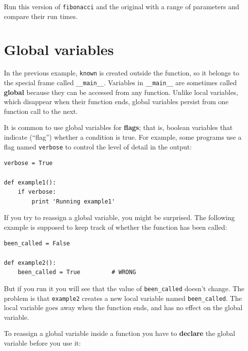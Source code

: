 \documentclass[10pt]{book}
\begin{document}
\begin{ex}
Run this version of {\tt fibonacci} and the original with
a range of parameters and compare their run times.
\end{ex}


\section{Global variables}


In the previous example, {\tt known} is created outside the function,
so it belongs to the special frame called \verb"__main__".
Variables in \verb"__main__" are sometimes called {\bf global}
because they can be accessed from any function.  Unlike local
variables, which disappear when their function ends, global variables
persist from one function call to the next.


It is common to use global variables for {\bf flags}; that is, 
boolean variables that indicate (``flag'') whether a condition
is true.  For example, some programs use
a flag named {\tt verbose} to control the level of detail in the
output:

\beforeverb
\begin{verbatim}
verbose = True

def example1():
    if verbose:
        print 'Running example1'
\end{verbatim}
\afterverb
%
If you try to reassign a global variable, you might be surprised.
The following example is supposed to keep track of whether the
function has been called:


\beforeverb
\begin{verbatim}
been_called = False

def example2():
    been_called = True         # WRONG
\end{verbatim}
\afterverb
%
But if you run it you will see that the value of \verb"been_called"
doesn't change.  The problem is that {\tt example2} creates a new local
variable named \verb"been_called".  The local variable goes away when
the function ends, and has no effect on the global variable.


To reassign a global variable inside a function you have to
{\bf declare} the global variable before you use it:
\end{document}
